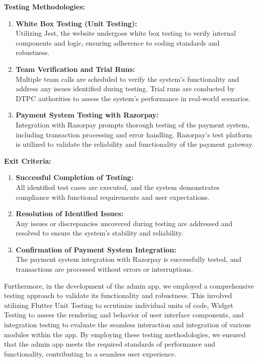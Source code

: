 \documentclass[12pt,a4paper]{report}
\begin{document}
\textbf{Testing Methodologies:}
\begin{enumerate}
    \item \textbf{White Box Testing (Unit Testing):} \\
          Utilizing Jest, the website undergoes white box testing to verify internal components and logic, ensuring adherence to coding standards and robustness.

    \item \textbf{Team Verification and Trial Runs:} \\
          Multiple team calls are scheduled to verify the system's functionality and address any issues identified during testing. Trial runs are conducted by DTPC authorities to assess the system's performance in real-world scenarios.

    \item \textbf{Payment System Testing with Razorpay:} \\
          Integration with Razorpay prompts thorough testing of the payment system, including transaction processing and error handling. Razorpay's test platform is utilized to validate the reliability and functionality of the payment gateway.
\end{enumerate}

\textbf{Exit Criteria:}
\begin{enumerate}
    \item \textbf{Successful Completion of Testing:} \\
          All identified test cases are executed, and the system demonstrates compliance with functional requirements and user expectations.

    \item \textbf{Resolution of Identified Issues:} \\
          Any issues or discrepancies uncovered during testing are addressed and resolved to ensure the system's stability and reliability.

    \item \textbf{Confirmation of Payment System Integration:} \\
          The payment system integration with Razorpay is successfully tested, and transactions are processed without errors or interruptions.
\end{enumerate}

Furthermore, in the development of the admin app, we employed a comprehensive testing approach to validate its functionality and robustness. This involved utilizing Flutter Unit Testing to scrutinize individual units of code, Widget Testing to assess the rendering and behavior of user interface components, and integration testing to evaluate the seamless interaction and integration of various modules within the app. By employing these testing methodologies, we ensured that the admin app meets the required standards of performance and functionality, contributing to a seamless user experience.
\end{document}
